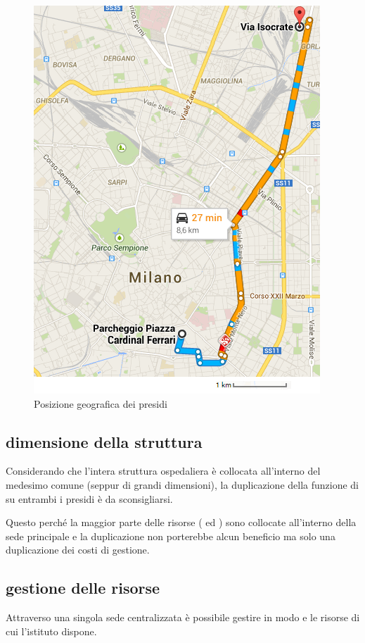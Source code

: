 \begin{figure}[htbp]
\centering
\includegraphics[scale=0.6]{Images/maps.png}
\caption{Posizione geografica dei presidi}
\label{sd-structure-maps}
\end{figure}

\subsection[Dimensione della struttura]{dimensione della struttura}
\label{sd-structure-size}
Considerando che l'intera struttura ospedaliera è collocata all'interno del medesimo comune (seppur di grandi dimensioni), la duplicazione della funzione di  su entrambi i presidi è da sconsigliarsi.

Questo perché la maggior parte delle risorse ( ed ) sono collocate all'interno della sede principale e la duplicazione non porterebbe alcun beneficio ma solo una duplicazione dei costi di gestione.

\subsection[Gestione delle risorse]{gestione delle risorse}
\label{sd-structure-resource-management}
Attraverso una singola sede centralizzata è possibile gestire in modo  e  le risorse di cui l'istituto dispone.

